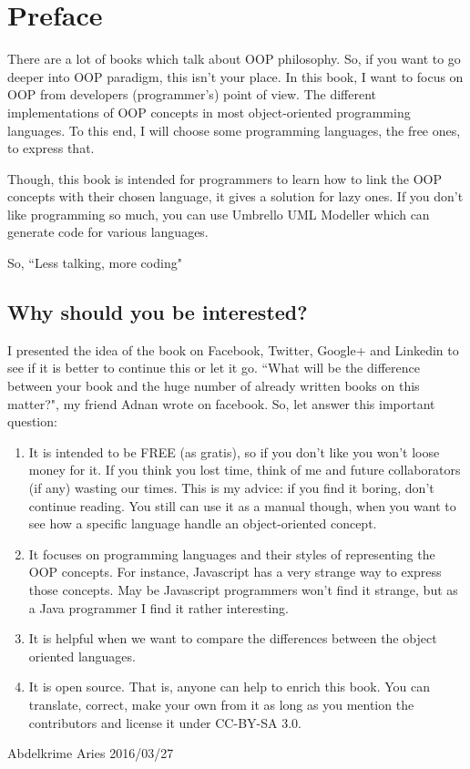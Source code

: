 \documentclass[12pt]{book}
\begin{document}
	\chapter*{Preface}
\fi

There are a lot of books which talk about OOP philosophy. 
So, if you want to go deeper into OOP paradigm, this isn't your place. 
In this book, I want to focus on OOP from developers (programmer's) point of view.
The different implementations of OOP concepts in most object-oriented programming languages.
To this end, I will choose some programming languages, the free ones, to express that.

Though, this book is intended for programmers to learn how to link the OOP concepts with their chosen language, it gives a solution for lazy ones. 
If you don't like programming so much, you can use Umbrello UML Modeller which can generate code for various languages. 

\vfill
\begin{flushright}
So, ``Less talking, more coding"
\end{flushright}

\newpage

\section*{Why should you be interested?}
I presented the idea of the book on Facebook, Twitter, Google+ and Linkedin to see if it is better to continue this or let it go. 
``What will be the difference between your book and the huge number of already written books on this matter?", my friend Adnan wrote on facebook. 
So, let answer this important question:
\begin{enumerate}
\item It is intended to be FREE (as gratis), so if you don't like you won't loose money for it. 
If you think you lost time, think of me and future collaborators (if any) wasting our times. 
This is my advice: if you find it boring, don't continue reading. 
You still can use it as a manual though, when you want to see how a specific language handle an object-oriented concept.

\item It focuses on programming languages and their styles of representing the OOP concepts. 
For instance, Javascript has a very strange way to express those concepts. 
May be Javascript programmers won't find it strange, but as a Java programmer I find it rather interesting.

\item It is helpful when we want to compare the differences between the object oriented languages.

\item It is open source. 
That is, anyone can help to enrich this book. 
You can translate, correct, make your own from it as long as you mention the contributors and license it under CC-BY-SA 3.0.

\end{enumerate}
\vfill
\begin{flushright}
Abdelkrime Aries 2016/03/27
\end{flushright}

\ifx\wholebook\relax\else
% 
% 
	
\end{document}
